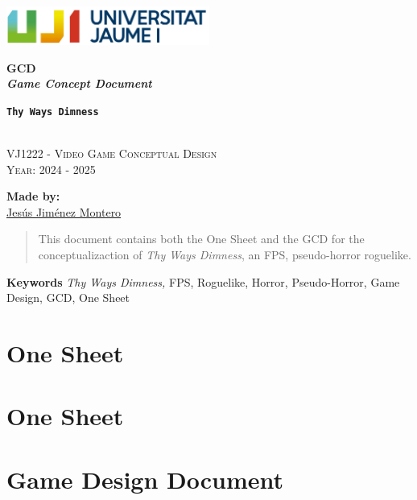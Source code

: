 \documentclass[12pt]{article}
\newcommand{\gameTitle}{\texttt{\textbf{Thy Ways Dimness}}}
\begin{document}
\begin{titlepage}
    \centering
    \vspace*{5cm}

    \includegraphics[width=0.5\textwidth]{Imagenes/marca-uji-color.jpg}\par\vspace{1cm}

    {\Huge \bfseries GCD \\ \textit{Game Concept Document} \par}
    {\large \bfseries \gameTitle \par}

    \textsc{\large }
    \vspace{0.5cm} \\
    \textsc{\Large VJ1222 - Video Game Conceptual Design}
    \vspace{0.5cm} \\
    \textsc{\large Year: 2024 - 2025}
    \vfill

    \textbf{Made by:}         \\
    \href{https://www.richardotomislav.com/}{Jesús Jiménez Montero }      \\

    \vspace{1cm}

    \vfill
\end{titlepage}

\begin{abstract}
    This document contains both the One Sheet and the GCD for the conceptualizaction of \textit{Thy Ways Dimness}, an FPS, pseudo-horror roguelike.
\end{abstract}
{\small \textbf{Keywords} \textit{Thy Ways Dimness,} FPS, Roguelike, Horror, Pseudo-Horror, Game Design, GCD, One Sheet}
\newpage

\renewcommand{\contentsname}{Table of Contents}
\tableofcontents
\newpage

\listoffigures
\newpage


\section*{\huge{One Sheet}}
\section*{\huge{One Sheet}}

\newpage
\section*{\huge{Game Design Document}}

\end{document}

